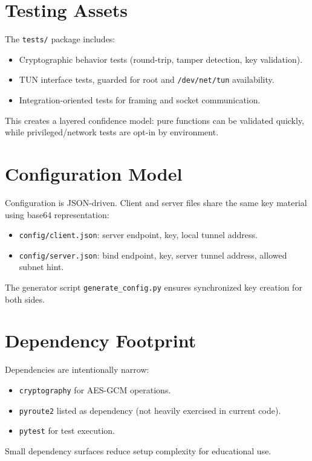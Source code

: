 \section{Testing Assets}
The \texttt{tests/} package includes:
\begin{itemize}[leftmargin=2em]
\item Cryptographic behavior tests (round-trip, tamper detection, key validation).
\item TUN interface tests, guarded for root and \texttt{/dev/net/tun} availability.
\item Integration-oriented tests for framing and socket communication.
\end{itemize}

This creates a layered confidence model: pure functions can be validated quickly, while privileged/network tests are opt-in by environment.

\section{Configuration Model}
Configuration is JSON-driven. Client and server files share the same key material using base64 representation:
\begin{itemize}[leftmargin=2em]
\item \texttt{config/client.json}: server endpoint, key, local tunnel address.
\item \texttt{config/server.json}: bind endpoint, key, server tunnel address, allowed subnet hint.
\end{itemize}

The generator script \texttt{generate\_config.py} ensures synchronized key creation for both sides.

\section{Dependency Footprint}
Dependencies are intentionally narrow:
\begin{itemize}[leftmargin=2em]
\item \texttt{cryptography} for AES-GCM operations.
\item \texttt{pyroute2} listed as dependency (not heavily exercised in current code).
\item \texttt{pytest} for test execution.
\end{itemize}

Small dependency surfaces reduce setup complexity for educational use.

